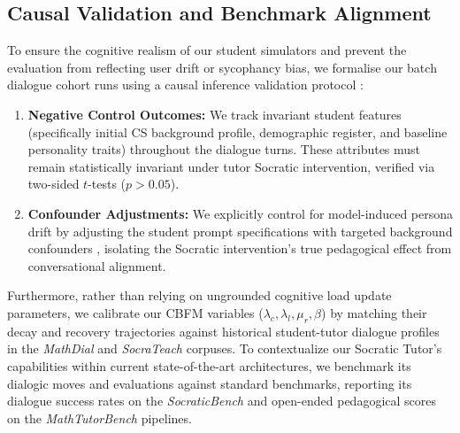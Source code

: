 \subsection{Causal Validation and Benchmark Alignment}
To ensure the cognitive realism of our student simulators and prevent the evaluation from reflecting user drift or sycophancy bias, we formalise our batch dialogue cohort runs using a causal inference validation protocol \cite{lin2026illusion}:
\begin{enumerate}
    \item \textbf{Negative Control Outcomes:} We track invariant student features (specifically initial CS background profile, demographic register, and baseline personality traits) throughout the dialogue turns. These attributes must remain statistically invariant under tutor Socratic intervention, verified via two-sided $t$-tests ($p > 0.05$).
    \item \textbf{Confounder Adjustments:} We explicitly control for model-induced persona drift by adjusting the student prompt specifications with targeted background confounders \cite{lin2026illusion}, isolating the Socratic intervention's true pedagogical effect from conversational alignment.
\end{enumerate}
Furthermore, rather than relying on ungrounded cognitive load update parameters, we calibrate our CBFM variables ($\lambda_c, \lambda_l, \mu_r, \beta$) by matching their decay and recovery trajectories against historical student-tutor dialogue profiles in the \textit{MathDial} \cite{macina2023mathdial} and \textit{SocraTeach} \cite{liu2024socraticlm} corpuses. To contextualize our Socratic Tutor's capabilities within current state-of-the-art architectures, we benchmark its dialogic moves and evaluations against standard benchmarks, reporting its dialogue success rates on the \textit{SocraticBench} \cite{gatti2026socratic} and open-ended pedagogical scores on the \textit{MathTutorBench} \cite{mathtutorbench2025} pipelines.

